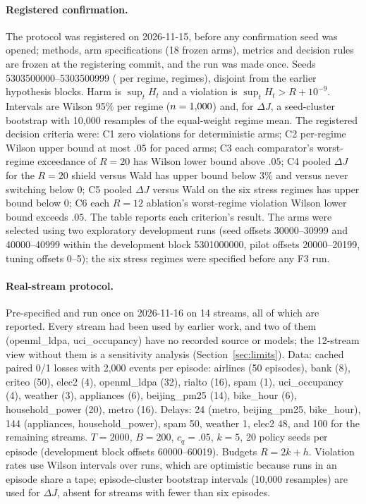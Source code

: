 \documentclass[10pt]{article}
\theoremstyle{plain}
\theoremstyle{definition}
\begin{document}
\paragraph{Registered confirmation.}
The protocol was registered on 2026-11-15, before any confirmation seed was opened; methods, arm specifications (18 frozen arms), metrics and decision rules are frozen at the registering commit, and the run was made once. Seeds 5303500000--5303500999 (\NSeedsPerRegime{} per regime, \NRegimes{} regimes), disjoint from the earlier hypothesis blocks. Harm is $\sup_tH_t$ and a violation is $\sup_tH_t>R+10^{-9}$. Intervals are Wilson 95\% per regime ($n=1{,}000$) and, for $\Delta J$, a seed-cluster bootstrap with 10{,}000 resamples of the equal-weight regime mean.
The registered decision criteria were: C1 zero violations for deterministic arms; C2 per-regime Wilson upper bound at most $.05$ for paced arms; C3 each comparator's worst-regime exceedance of $R=20$ has Wilson lower bound above $.05$; C4 pooled $\Delta J$ for the $R=20$ shield versus Wald has upper bound below 3\% and versus never switching below $0$; C5 pooled $\Delta J$ versus Wald on the six stress regimes has upper bound below $0$; C6 each $R=12$ ablation's worst-regime violation Wilson lower bound exceeds $.05$. The table reports each criterion's result. The arms were selected using two exploratory development runs (seed offsets 30000--30999 and 40000--40999 within the development block 5301000000, pilot offsets 20000--20199, tuning offsets 0--5); the six stress regimes were specified before any F3 run.

\paragraph{Real-stream protocol.}
Pre-specified and run once on 2026-11-16 on 14 streams, all of which are reported. Every stream had been used by earlier work, and two of them (openml\_ldpa, uci\_occupancy) have no recorded source or models; the 12-stream view without them is a sensitivity analysis (Section~\ref{sec:limits}). Data: cached paired 0/1 losses with 2{,}000 events per episode: airlines (50 episodes), bank (8), criteo (50), elec2 (4), openml\_ldpa (32), rialto (16), spam (1), uci\_occupancy (4), weather (3), appliances (6), beijing\_pm25 (14), bike\_hour (6), household\_power (20), metro (16). Delays: 24 (metro, beijing\_pm25, bike\_hour), 144 (appliances, household\_power), spam 50, weather 1, elec2 48, and 100 for the remaining streams. $T=2000$, $B=200$, $c_q=.05$, $k=5$, 20 policy seeds per episode (development block offsets 60000--60019). Budgets $R=2k+h$. Violation rates use Wilson intervals over runs, which are optimistic because runs in an episode share a tape; episode-cluster bootstrap intervals (10{,}000 resamples) are used for $\Delta J$, absent for streams with fewer than six episodes.
\end{document}
